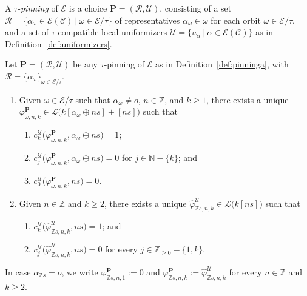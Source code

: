 \documentclass[10pt,a4paper]{amsart}
\newcommand{\Ca}{\mathcal{C}} %
\newcommand{\Cq}{\mathcal{C}} %
\newcommand{\Z}{\mathbb{Z}} %
\newcommand{\ec}{\mathcal{E}} %
\newcommand{\idec}{{o}} %
\newcommand{\orbita}{{\ec/\tau}} %
\begin{document}
\begin{definition}\label{def:pinninga}
    A $\tau$-\emph{pinning} of $\ec$ is a choice $\mathbf{P}=(\mathcal{R},\mathcal{U})$, consisting of a set $\mathcal{R}=\{\alpha_\omega\in\ec(\Cq) \ | \ \omega\in\orbita\}$ of representatives $\alpha_\omega\in\omega$ for each orbit $\omega\in\orbita$, and a set of $\tau$-compatible local uniformizers $\mathcal{U}=\{u_\alpha \ | \ \alpha\in\ec(\Ca)\}$ as in Definition~\ref{def:uniformizers}.
\end{definition}

\begin{deflem} \label{deflem:phia}Let $\mathbf{P}=(\mathcal{R},\mathcal{U})$ be any $\tau$-pinning of $\ec$ as in Definition~\ref{def:pinninga}, with $\mathcal{R}=\{\alpha_\omega\}_{ \omega\in\orbita}$. 
\begin{enumerate}
    
    \item Given $\omega\in\orbita$ such that $\alpha_\omega\neq\idec$, $n\in\Z$, and $k\geq 1$, there exists a unique $\varphi^\mathbf{P}_{\omega,n,k}\in\mathcal{L}\bigl(k[\alpha_\omega\oplus ns]+[ns]\bigr)$ such that \begin{enumerate}
    \item $c_k^\mathcal{U}\bigl(\varphi^\mathbf{P}_{\omega,n,k},\alpha_\omega\oplus ns\bigr)=1$; 
    \item $c_j^\mathcal{U}\bigl(\varphi^\mathbf{P}_{\omega,n,k},\alpha_\omega\oplus ns\bigr)=0$ for $j\in\mathbb{N}-\{k\}$; and 
    \item $c_0^\mathcal{U}\bigl(\varphi^\mathbf{P}_{\omega,n,k},ns\bigr)=0$.
    \end{enumerate}
    \item Given $n\in\Z$ and $k\geq 2$, there exists a unique $\hat{\varphi}^\mathcal{U}_{\Z s,n,k}\in\mathcal{L}\bigl(k[ns]\bigr)$ such that \begin{enumerate}
    \item $c_k^\mathcal{U}\bigl(\hat{\varphi}^\mathcal{U}_{\Z s,n,k},ns\bigr)=1$; and
        \item $c_j^\mathcal{U}\bigl(\hat{\varphi}^\mathcal{U}_{\Z s,n,k},ns\bigr)=0$ for every $j\in\Z_{\geq 0}-\{1,k\}$.
    \end{enumerate}
\end{enumerate}
In case $\alpha_{\Z s}=\idec$, we write $\varphi^\mathbf{P}_{\Z s,n,1}:=0$ and $\varphi^{\mathbf{P}}_{\Z s,n,k}:=\hat{\varphi}^{\mathcal{U}}_{\Z s,n,k}$ for every $n\in\Z$ and $k\geq 2$.
\end{deflem}
\end{document}
